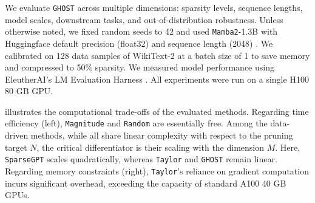 \documentclass{article}
\theoremstyle{plain}
\theoremstyle{definition}
\theoremstyle{remark}
\begin{document}




We evaluate \texttt{GHOST} across multiple dimensions: sparsity levels, sequence lengths, model scales, downstream tasks, and out-of-distribution robustness. Unless otherwise noted, we fixed random seeds to 42 and used \texttt{Mamba2}-1.3B with Huggingface default precision (float32) and sequence length (2048) \citep{wolf2020huggingfacestransformersstateoftheartnatural}. We calibrated on 128 data samples of WikiText-2 \citep{merity2016pointersentinelmixturemodels} at a batch size of 1 to save memory and compressed to 50\% sparsity. We measured model performance using EleutherAI's LM Evaluation Harness \citep{eval-harness}. All experiments were run on a single H100 80 GB GPU.


 illustrates the computational trade-offs of the evaluated methods. Regarding time efficiency (left), \texttt{Magnitude} and \texttt{Random} are essentially free. Among the data-driven methods, while all share linear complexity with respect to the pruning target $N$, the critical differentiator is their scaling with the dimension $M$. Here, \texttt{SparseGPT} scales quadratically, whereas \texttt{Taylor} and \texttt{GHOST} remain linear. Regarding memory constraints (right), \texttt{Taylor}'s reliance on gradient computation incurs significant overhead, exceeding the capacity of standard A100 40 GB GPUs.
\end{document}
